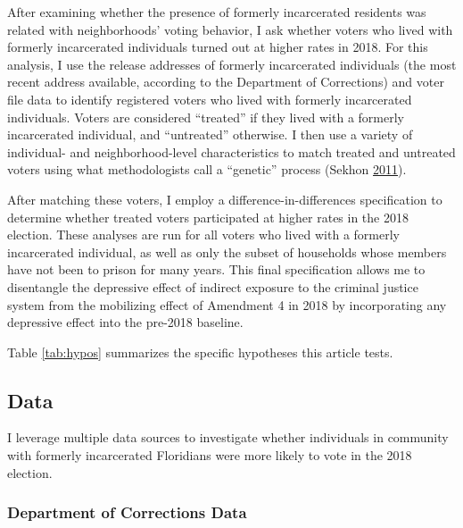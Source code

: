 \documentclass[
  12pt,
]{article}
\begin{document}
After examining whether the presence of formerly incarcerated residents was related with neighborhoods' voting behavior, I ask whether voters who lived with formerly incarcerated individuals turned out at higher rates in 2018. For this analysis, I use the release addresses of formerly incarcerated individuals (the most recent address available, according to the Department of Corrections) and voter file data to identify registered voters who lived with formerly incarcerated individuals. Voters are considered ``treated'' if they lived with a formerly incarcerated individual, and ``untreated'' otherwise. I then use a variety of individual- and neighborhood-level characteristics to match treated and untreated voters using what methodologists call a ``genetic'' process (Sekhon \protect\hyperlink{ref-Sekhon2011}{2011}).

After matching these voters, I employ a difference-in-differences specification to determine whether treated voters participated at higher rates in the 2018 election. These analyses are run for all voters who lived with a formerly incarcerated individual, as well as only the subset of households whose members have not been to prison for many years. This final specification allows me to disentangle the depressive effect of indirect exposure to the criminal justice system from the mobilizing effect of Amendment 4 in 2018 by incorporating any depressive effect into the pre-2018 baseline.

Table \ref{tab:hypos} summarizes the specific hypotheses this article tests.



\hypertarget{data}{%
\subsection*{Data}\label{data}}

I leverage multiple data sources to investigate whether individuals in community with formerly incarcerated Floridians were more likely to vote in the 2018 election.

\hypertarget{department-of-corrections-data}{%
\subsubsection*{Department of Corrections Data}\label{department-of-corrections-data}}
\end{document}
